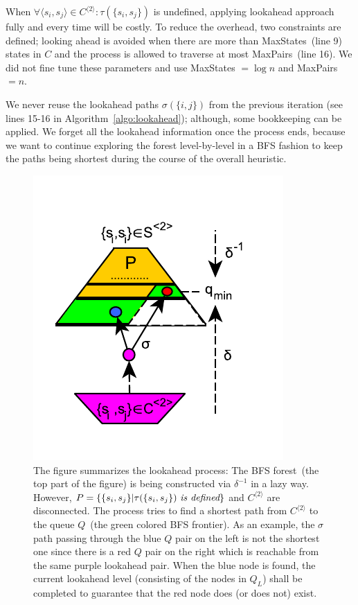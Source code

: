 \documentclass[12pt]{article}
\begin{document}
When $\forall \langle s_i,s_j \rangle \in C^{\langle 2 \rangle}: \tau(\{s_i,s_j \})$ is undefined, applying lookahead approach fully and every time will be costly. To reduce the overhead, two constraints are defined; looking ahead is avoided when there are more than {\sc MaxStates}~(line 9)  states in $C$ and the process is allowed to traverse at most {\sc MaxPairs}~(line 16). We did not fine tune these parameters and use {\sc MaxStates} $= \log n$ and {\sc MaxPairs} $= n$. 

We never reuse the lookahead paths $\sigma(\{ i, j \})$ from the previous iteration (see lines 15-16 in Algorithm~\ref{algo:lookahead}); although, some bookkeeping can be applied. We forget all the lookahead information once the process ends, because we want to continue exploring the forest level-by-level in a BFS fashion to keep the paths being shortest during the course of the overall heuristic. 



\begin{figure}[ht]
	\centering
	\includegraphics{figs/la.pdf}
	\caption{The figure summarizes the lookahead process: The BFS forest~(the top part of the figure) is being constructed via $\delta^{-1}$ in a lazy way. However, $P = \{ \{s_i, s_j \} | \tau(\{s_i, s_j \})~ \mbox{\em is defined} \}$ and $C^{\langle 2 \rangle}$ are disconnected. The process tries to find a shortest path from $C^{\langle 2 \rangle}$ to the queue $Q$~(the green colored BFS frontier). As an example, the $\sigma$ path passing through the blue $Q$ pair on the left is not the shortest one since there is a red $Q$ pair on the right which is reachable from the same purple lookahead pair. When the blue node is found, the current lookahead level (consisting of the nodes in $Q_L$) shall be completed to guarantee that the red node does (or does not) exist.}
	\label{fig:lookahead}
\end{figure}
\end{document}
